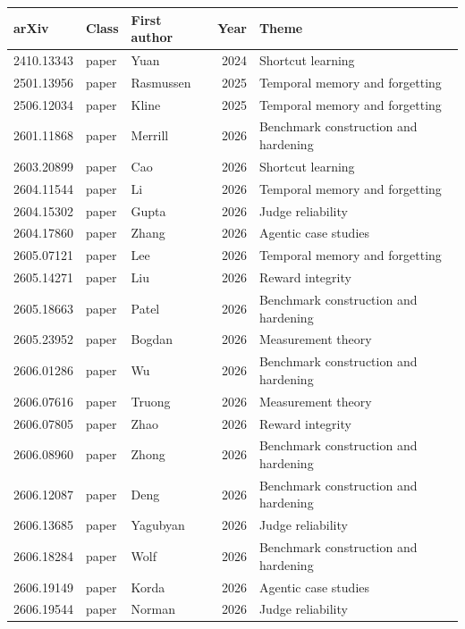 \begin{tabular}{@{}lllrl@{}}
\toprule
arXiv & Class & First author & Year & Theme \\
\midrule
2410.13343 & paper & Yuan & 2024 & Shortcut learning \\
2501.13956 & paper & Rasmussen & 2025 & Temporal memory and forgetting \\
2506.12034 & paper & Kline & 2025 & Temporal memory and forgetting \\
2601.11868 & paper & Merrill & 2026 & Benchmark construction and hardening \\
2603.20899 & paper & Cao & 2026 & Shortcut learning \\
2604.11544 & paper & Li & 2026 & Temporal memory and forgetting \\
2604.15302 & paper & Gupta & 2026 & Judge reliability \\
2604.17860 & paper & Zhang & 2026 & Agentic case studies \\
2605.07121 & paper & Lee & 2026 & Temporal memory and forgetting \\
2605.14271 & paper & Liu & 2026 & Reward integrity \\
2605.18663 & paper & Patel & 2026 & Benchmark construction and hardening \\
2605.23952 & paper & Bogdan & 2026 & Measurement theory \\
2606.01286 & paper & Wu & 2026 & Benchmark construction and hardening \\
2606.07616 & paper & Truong & 2026 & Measurement theory \\
2606.07805 & paper & Zhao & 2026 & Reward integrity \\
2606.08960 & paper & Zhong & 2026 & Benchmark construction and hardening \\
2606.12087 & paper & Deng & 2026 & Benchmark construction and hardening \\
2606.13685 & paper & Yagubyan & 2026 & Judge reliability \\
2606.18284 & paper & Wolf & 2026 & Benchmark construction and hardening \\
2606.19149 & paper & Korda & 2026 & Agentic case studies \\
2606.19544 & paper & Norman & 2026 & Judge reliability \\
\bottomrule
\end{tabular}
